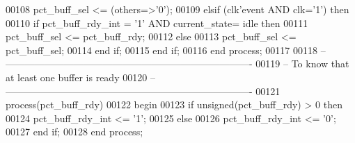 \begin{DoxyCode}
00108       \textcolor{vhdlchar}{pct_buff_sel} \textcolor{vhdlchar}{<=} \textcolor{vhdlchar}{(}\textcolor{keywordflow}{others}\textcolor{vhdlchar}{=}\textcolor{vhdlchar}{>}\textcolor{vhdlchar}{'}\textcolor{vhdllogic}{}\textcolor{vhdllogic}{0}\textcolor{vhdlchar}{'}\textcolor{vhdlchar}{)};
00109    \textcolor{keywordflow}{elsif} \textcolor{vhdlchar}{(}\textcolor{vhdlchar}{clk}\textcolor{vhdlchar}{'}\textcolor{vhdlkeyword}{event} \textcolor{keywordflow}{AND} \textcolor{vhdlchar}{clk}\textcolor{vhdlchar}{=}\textcolor{vhdlchar}{'}\textcolor{vhdllogic}{}\textcolor{vhdllogic}{1}\textcolor{vhdlchar}{'}\textcolor{vhdlchar}{)} \textcolor{keywordflow}{then} 
00110       \textcolor{keywordflow}{if} \textcolor{vhdlchar}{pct_buff_rdy_int} \textcolor{vhdlchar}{=} \textcolor{vhdlchar}{'}\textcolor{vhdllogic}{}\textcolor{vhdllogic}{1}\textcolor{vhdlchar}{'} \textcolor{keywordflow}{AND} \textcolor{vhdlchar}{current_state}\textcolor{vhdlchar}{=} \textcolor{vhdlchar}{idle} \textcolor{keywordflow}{then} 
00111          \textcolor{vhdlchar}{pct_buff_sel} \textcolor{vhdlchar}{<=} \textcolor{vhdlchar}{pct_buff_rdy};
00112       \textcolor{keywordflow}{else} 
00113          \textcolor{vhdlchar}{pct_buff_sel} \textcolor{vhdlchar}{<=} \textcolor{vhdlchar}{pct_buff_sel};
00114       \textcolor{keywordflow}{end} \textcolor{keywordflow}{if};
00115    \textcolor{keywordflow}{end} \textcolor{keywordflow}{if};
00116 \textcolor{keywordflow}{end} \textcolor{keywordflow}{process};
00117 
00118 \textcolor{keyword}{-- ----------------------------------------------------------------------------}
00119 \textcolor{keyword}{-- To know that at least one buffer is ready}
00120 \textcolor{keyword}{-- ----------------------------------------------------------------------------}
00121 \textcolor{keywordflow}{process}(pct_buff_rdy)
00122 \textcolor{vhdlkeyword}{begin }
00123    \textcolor{keywordflow}{if} \textcolor{comment}{unsigned}\textcolor{vhdlchar}{(}\textcolor{vhdlchar}{pct_buff_rdy}\textcolor{vhdlchar}{)} \textcolor{vhdlchar}{>} \textcolor{vhdllogic}{}\textcolor{vhdllogic}{0} \textcolor{keywordflow}{then} 
00124       \textcolor{vhdlchar}{pct_buff_rdy_int} \textcolor{vhdlchar}{<=} \textcolor{vhdlchar}{'}\textcolor{vhdllogic}{}\textcolor{vhdllogic}{1}\textcolor{vhdlchar}{'};
00125    \textcolor{keywordflow}{else} 
00126       \textcolor{vhdlchar}{pct_buff_rdy_int} \textcolor{vhdlchar}{<=} \textcolor{vhdlchar}{'}\textcolor{vhdllogic}{}\textcolor{vhdllogic}{0}\textcolor{vhdlchar}{'};
00127    \textcolor{keywordflow}{end} \textcolor{keywordflow}{if};
00128 \textcolor{keywordflow}{end} \textcolor{keywordflow}{process};

\end{DoxyCode}
